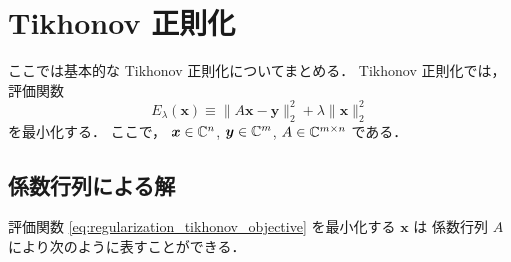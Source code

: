 %

\chapter{Tikhonov 正則化}

ここでは基本的な Tikhonov 正則化についてまとめる．
Tikhonov 正則化では，評価関数
\begin{equation}
    E_{\lambda}(\bm{x}) \equiv \|A \bm{x} - \bm{y}\|_2^2 + \lambda \|\bm{x}\|_2^2
    \label{eq:regularization_tikhonov_objective}
\end{equation}
を最小化する．
ここで，
$\bm{x} \in \mathbb{C}^n$,
$\bm{y} \in \mathbb{C}^m$,
$A \in \mathbb{C}^{m \times n}$
である．

\section{係数行列による解}

評価関数 \eqref{eq:regularization_tikhonov_objective} を最小化する $\bm{x}$ は
係数行列 $A$ により次のように表すことができる．


